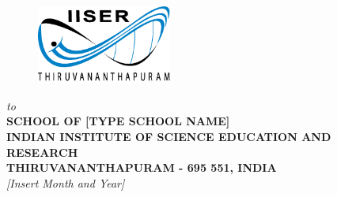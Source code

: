 \begin{titlepage}
\begin{center}
\vfill

\begin{figure}[h]
  \begin{center}
  \includegraphics[height=26mm]{Images & Logos/iiser_logo.png}
  \end{center}
\end{figure}
\vspace*{0.2cm}

{\em\large to }\\%
{\bf\large SCHOOL OF [TYPE SCHOOL NAME]} \\%
{\bf\large INDIAN INSTITUTE OF SCIENCE EDUCATION AND RESEARCH}\\%
{\bf\large THIRUVANANTHAPURAM - 695 551, INDIA}\\%
{\it\large [Insert Month and Year]}

\end{center}

\end{titlepage}

\clearpage

